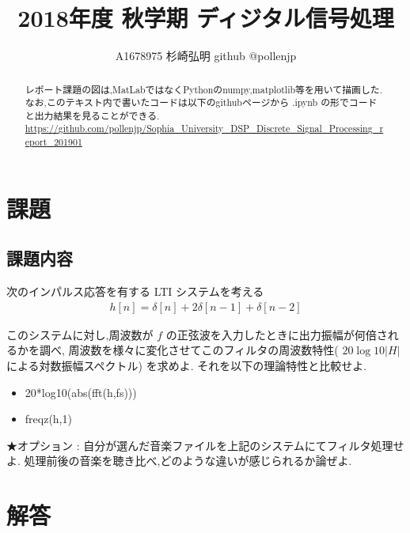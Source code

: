 \documentclass[12pt]{jsarticle}
\title{2018年度 秋学期 ディジタル信号処理}
\author{A1678975 杉崎弘明 github @pollenjp}
\begin{document}
    \maketitle

    \begin{abstract}
      レポート課題の図は,MatLabではなくPythonのnumpy,matplotlib等を用いて描画した.
      なお,このテキスト内で書いたコードは以下のgithubページから .ipynb の形でコードと出力結果を見ることができる.
      \url{https://github.com/pollenjp/Sophia_University_DSP_Discrete_Signal_Processing_report_201901}
	    \tableofcontents
    \end{abstract}
    
    \section{課題} \label{課題}
      \subsection{課題内容} \label{課題内容}
      次のインパルス応答を有する LTI システムを考える
      \begin{align*}
        h [n] = \delta [n] + 2 \delta [n-1] + \delta [n-2]
      \end{align*}

      このシステムに対し,周波数が $f$ の正弦波を入力したときに出力振幅が何倍されるかを調べ,
      周波数を様々に変化させてこのフィルタの周波数特性( $20 \log10 |H|$ による対数振幅スペクトル) を求めよ.
      それを以下の理論特性と比較せよ.

      \begin{itemize}
        \item 20*log10(abs(fft(h,fs)))
        \item freqz(h,1)
      \end{itemize}

      ★オプション : 
      自分が選んだ音楽ファイルを上記のシステムにてフィルタ処理せよ. 処理前後の音楽を聴き比べ,どのような違いが感じられるか論ぜよ.

      
    \section{解答} \label{解答}
\end{document}

